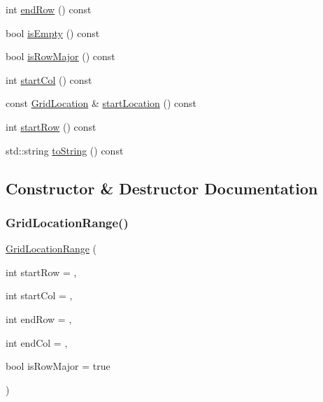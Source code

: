 \begin{DoxyCompactItemize}
\item 
int \mbox{\hyperlink{classGridLocationRange_a4090535ae1ccb444498c816bad6c2c64}{end\+Row}} () const
\item 
bool \mbox{\hyperlink{classGridLocationRange_acf82f9b2937375c7b1cf3dccb3df3312}{is\+Empty}} () const
\item 
bool \mbox{\hyperlink{classGridLocationRange_a78a78e39d2a36dd8eed1e83499d5a9d9}{is\+Row\+Major}} () const
\item 
int \mbox{\hyperlink{classGridLocationRange_a64ef3d56a680766cc1921bc92b4d5e3e}{start\+Col}} () const
\item 
const \mbox{\hyperlink{structGridLocation}{Grid\+Location}} \& \mbox{\hyperlink{classGridLocationRange_a91f18341eefcf80167580445c23449d0}{start\+Location}} () const
\item 
int \mbox{\hyperlink{classGridLocationRange_a83342cfc6cc0c1e7d335908d2bd9fb0b}{start\+Row}} () const
\item 
std\+::string \mbox{\hyperlink{classGridLocationRange_a1fe5121d6528fdea3f243321b3fa3a49}{to\+String}} () const
\end{DoxyCompactItemize}


\subsection{Constructor \& Destructor Documentation}
\mbox{\label{classGridLocationRange_ad35db7c23ea349daa74db15cb49e35ab}} 
\subsubsection{\texorpdfstring{Grid\+Location\+Range()}{GridLocationRange()}\hspace{0.1cm}{\footnotesize\ttfamily [1/2]}}
{\footnotesize\ttfamily \mbox{\hyperlink{classGridLocationRange}{Grid\+Location\+Range}} (\begin{DoxyParamCaption}\item[{int}]{start\+Row = {},  }\item[{int}]{start\+Col = {},  }\item[{int}]{end\+Row = {},  }\item[{int}]{end\+Col = {},  }\item[{bool}]{is\+Row\+Major = {\ttfamily true} }\end{DoxyParamCaption})}

